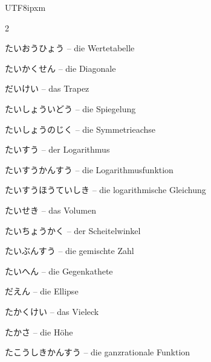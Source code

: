 \begin{CJK}{UTF8}{ipxm}
\begin{multicols}{2}
\par\nopagebreak
{} {\footnotesize\color{black!70}たいおうひょう} -- die Wertetabelle\dotfill\hyperref[e:112]{\pageref*{e:112}}\par
{} {\footnotesize\color{black!70}たいかくせん} -- die Diagonale\dotfill\hyperref[e:197]{\pageref*{e:197}}\par
{} {\footnotesize\color{black!70}だいけい} -- das Trapez\dotfill\hyperref[e:202]{\pageref*{e:202}}\par
{} {\footnotesize\color{black!70}たいしょういどう} -- die Spiegelung\dotfill\hyperref[e:172]{\pageref*{e:172}}\par
{} {\footnotesize\color{black!70}たいしょうのじく} -- die Symmetrieachse\dotfill\hyperref[e:171]{\pageref*{e:171}}\par
{} {\footnotesize\color{black!70}たいすう} -- der Logarithmus\dotfill\hyperref[e:95]{\pageref*{e:95}}\par
{} {\footnotesize\color{black!70}たいすうかんすう} -- die Logarithmusfunktion\dotfill\hyperref[e:131]{\pageref*{e:131}}\par
{} {\footnotesize\color{black!70}たいすうほうていしき} -- die logarithmische Gleichung\dotfill\hyperref[e:85]{\pageref*{e:85}}\par
{} {\footnotesize\color{black!70}たいせき} -- das Volumen\dotfill\hyperref[e:255]{\pageref*{e:255}}\par
{} {\footnotesize\color{black!70}たいちょうかく} -- der Scheitelwinkel\dotfill\hyperref[e:166]{\pageref*{e:166}}\par
{} {\footnotesize\color{black!70}たいぶんすう} -- die gemischte Zahl\dotfill\hyperref[e:33]{\pageref*{e:33}}\par
{} {\footnotesize\color{black!70}たいへん} -- die Gegenkathete\dotfill\hyperref[e:189]{\pageref*{e:189}}\par
{} {\footnotesize\color{black!70}だえん} -- die Ellipse\dotfill\hyperref[e:314]{\pageref*{e:314}}\par
{} {\footnotesize\color{black!70}たかくけい} -- das Vieleck\dotfill\hyperref[e:204]{\pageref*{e:204}}\par
{} {\footnotesize\color{black!70}たかさ} -- die Höhe\dotfill\hyperref[e:191]{\pageref*{e:191}}\par
{} {\footnotesize\color{black!70}たこうしきかんすう} -- die ganzrationale Funktion\dotfill\hyperref[e:126]{\pageref*{e:126}}\par

\end{multicols}
\end{CJK}
